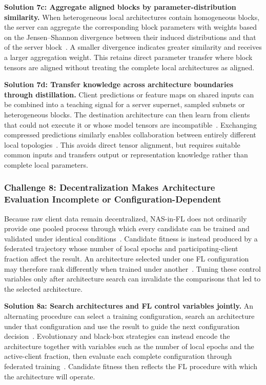 \noindent\textbf{Solution 7c: Aggregate aligned blocks by parameter-distribution similarity.} When heterogeneous local architectures contain homogeneous blocks, the server can aggregate the corresponding block parameters with weights based on the Jensen--Shannon divergence between their induced distributions and that of the server block~\cite{f2nas_2024}. A smaller divergence indicates greater similarity and receives a larger aggregation weight. This retains direct parameter transfer where block tensors are aligned without treating the complete local architectures as aligned.

\noindent\textbf{Solution 7d: Transfer knowledge across architecture boundaries through distillation.} Client predictions or feature maps on shared inputs can be combined into a teaching signal for a server supernet, sampled subnets or heterogeneous blocks. The destination architecture can then learn from clients that could not execute it or whose model tensors are incompatible~\cite{f2nas_2024,hapfnas_2025,collaborative_nas_for_pfl_2025}. Exchanging compressed predictions similarly enables collaboration between entirely different local topologies~\cite{hetefed_2023}. This avoids direct tensor alignment, but requires suitable common inputs and transfers output or representation knowledge rather than complete local parameters.

\subsubsection{Challenge 8: Decentralization Makes Architecture Evaluation Incomplete or Configuration-Dependent}

Because raw client data remain decentralized, NAS-in-FL does not ordinarily provide one pooled process through which every candidate can be trained and validated under identical conditions~\cite{fl_advances_and_open_problems_2021}. Candidate fitness is instead produced by a federated trajectory whose number of local epochs and participating-client fraction affect the result. An architecture selected under one FL configuration may therefore rank differently when trained under another~\cite{feathers_2023,aging_fednas_2025,breastcancer_fednas_2024}. Tuning these control variables only after architecture search can invalidate the comparisons that led to the selected architecture.

\noindent\textbf{Solution 8a: Search architectures and FL control variables jointly.} An alternating procedure can select a training configuration, search an architecture under that configuration and use the result to guide the next configuration decision~\cite{feathers_2023}. Evolutionary and black-box strategies can instead encode the architecture together with variables such as the number of local epochs and the active-client fraction, then evaluate each complete configuration through federated training~\cite{aging_fednas_2025,breastcancer_fednas_2024}. Candidate fitness then reflects the FL procedure with which the architecture will operate.

